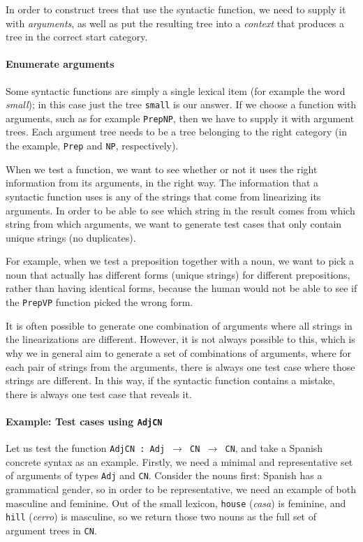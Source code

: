 \documentclass[11pt]{article}
\def\t#1{\texttt{#1}}
\begin{document}
In order to construct trees that use the syntactic function, we need to supply it with \emph{arguments}, as well as put the resulting tree into a \emph{context} that produces a tree in the correct start category.

\paragraph{Enumerate arguments} Some syntactic functions are simply a single lexical item (for example the word \emph{small}); in this case just the tree \t{small} is our answer. If we choose a function with arguments, such as for example \t{PrepNP}, then we have to supply it with argument trees. Each argument tree needs to be a tree belonging to the right category (in the example, \t{Prep} and \t{NP}, respectively).

When we test a function, we want to see whether or not it uses the right information from its arguments, in the right way. The information that a syntactic function uses is any of the strings that come from linearizing its arguments. In order to be able to see which string in the result comes from which string from which arguments, we want to generate test cases that only contain unique strings (no duplicates).

For example, when we test a preposition together with a noun, we want to pick a noun that actually has different forms (unique strings) for different prepositions, rather than having identical forms, because the human would not be able to see if the \t{PrepVP} function picked the wrong form.

It is often possible to generate one combination of arguments where all strings in the linearizations are different. However, it is not always possible to this, which is why we in general aim to generate a set of combinations of arguments, where for each pair of strings from the arguments, there is always one test case where those strings are different. In this way, if the syntactic function contains a mistake, there is always one test case that reveals it.

\paragraph{Example: Test cases using \t{AdjCN}} Let us test the function
\t{AdjCN : Adj $\rightarrow$ CN $\rightarrow$ CN}, and take a Spanish
concrete syntax as an example. 
Firstly, we need a minimal and representative set of arguments of types
\t{Adj} and \t{CN}. Consider the nouns first: Spanish has a
grammatical gender, so in order to be representative, we need an
example of both masculine and feminine. Out of the small lexicon,
\t{house} (\emph{casa}) is feminine, and \t{hill} (\emph{cerro}) is
masculine, so we return those two nouns as the full set of argument
trees in \t{CN}. 
\end{document}
